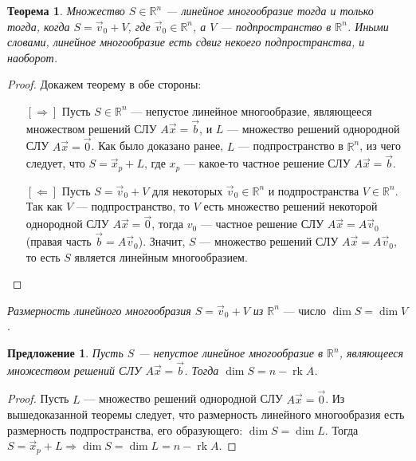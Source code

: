 \documentclass[a4paper, 12pt]{article}
\DeclareMathOperator{\rk}{rk}
\newtheorem*{proposal}{Предложение}
\newtheorem*{linear_manifold_1}{Теорема}
\begin{document}
\begin{linear_manifold_1}
Множество $S \in \mathbb{R}^n$ --- линейное многообразие тогда и только тогда, когда $S = \vec v_0 + V$, где $\vec v_0 \in \mathbb{R}^n$, а $V$ --- подпространство в $\mathbb{R}^n$. Иными словами,
линейное многообразие есть сдвиг некоего подпространства, и наоборот.
\end{linear_manifold_1}

\begin{proof} Докажем теорему в обе стороны:
\begin{itemize}

\item[{$[\Rightarrow]$}] 
Пусть $S \in \mathbb{R}^n$ --- непустое линейное многообразие, являющееся множеством решений СЛУ $A\vec x = \vec b$, и $L$ --- множество решений однородной СЛУ $A \vec x = \vec 0$. Как было доказано ранее, $L$ --- подпространство в $\mathbb{R}^n$, из чего следует, что $S = \vec x_p + L$, где $x_p$ --- какое-то частное решение СЛУ $A\vec x = \vec b$.

\item[{$[\Leftarrow]$}]
Пусть $S = \vec v_0 + V$ для некоторых $\vec v_0 \in \mathbb{R}^n$ и подпространства $V \in \mathbb{R}^n$. Так как $V$ --- подпространство, то $V$ есть множество решений некоторой однородной СЛУ $A\vec x = \vec 0$, тогда $v_0$ --- частное решение СЛУ $A\vec x = A\vec v_0$ (правая часть $\vec b = A\vec v_0$). Значит, $S$ --- множество решений СЛУ $A\vec x = A\vec v_0$, то есть $S$ является линейным многообразием.
\end{itemize}
\end{proof}

\textit{Размерность линейного многообразия $S = \vec v_0 + V$ из $\mathbb{R}^n$} --- число $\dim S = \dim V$.

\begin{proposal}
Пусть $S$ --- непустое линейное многообразие в $\mathbb{R}^n$, являющееся множеством решений СЛУ $A\vec x = \vec b$. Тогда $\dim S = n - \rk A$.
\end{proposal}
\begin{proof}
Пусть $L$ --- множество решений однородной СЛУ $A\vec x = \vec 0$. Из вышедоказанной теоремы следует, что размерность линейного многообразия есть размерность подпространства, его образующего: $\dim{S} = \dim{L}$. Тогда $S = \vec x_p + L \Rightarrow \dim S = \dim L = n - \rk A$.
\end{proof}
\end{document}

